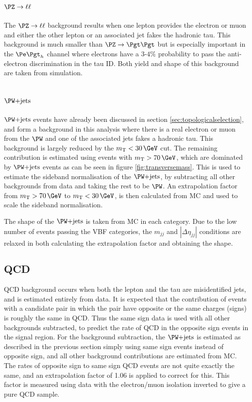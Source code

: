 \subsection{$\PZ\to\ell\ell$}
\label{sec:backgroundEstimation_Zll}

The $\PZ\to\ell\ell$ background results when one lepton provides the electron or
muon and either the other lepton or an associated jet fakes the hadronic tau. This
background is much smaller than $\ZToTauTau$ but is especially important in the
$\etau$ channel where electrons have a $3$-$4\%$ probability to pass the
anti-electron discrimination in the tau ID. Both yield and shape of this
background are taken from simulation.

\subsection{$\WJets$}
\label{sec:backgroundEstimation_WplusJets}

$\WJets$ events have already been discussed in section \ref{sec:topologicalselection},
and form a background in this analysis where there is a real electron or
muon from the $\PW$ and one of the associated jets fakes a hadronic tau. This
background is largely reduced by the $m_{\text{T}}< 30\,\GeV$ cut. 
The remaining contribution is estimated using 
events with $m_{\text{T}}> 70\,\GeV$, which are dominated by $\WJets$ 
events as can be seen in figure \ref{fig:transversemass}. 
This is used to estimate the sideband normalisation of the $\WJets$, by
subtracting all other backgrounds from data and taking the rest to be $\PW$.
An extrapolation factor from  $m_{\text{T}} > 70\,\GeV$ to $m_{\text{T}}< 30\,\GeV$, 
is then calculated from \ac{MC} and used to scale the sideband normalisation.

The shape of the $\WJets$ is taken from \ac{MC} in each category. Due to the low number of
events passing the VBF categories, the $m_{jj}$ and $|\Delta\eta_{jj}|$
conditions are relaxed in both calculating the extrapolation factor and
obtaining the shape.

\subsection{QCD}
\label{sec:backgroundEstimation_QCD}

QCD background occurs when both the lepton and the tau are misidentified jets, and is estimated 
entirely from data. It is expected that the contribution of events with a
candidate pair in which the pair have opposite or the same
charges (signs) is roughly the same in QCD. Thus the same
sign data is used with all other backgrounds subtracted, to predict the rate of
QCD in the opposite sign events in the signal region. 
For the background subtraction, the $\WJets$ is 
estimated as described in the previous section simply using same sign
events instead of opposite sign, and all other background
contributions are estimated from \ac{MC}. The rates of opposite sign to same
sign QCD events are not quite exactly the same, and an extrapolation factor of
1.06 is applied to correct for this. This factor is measured using data with the 
electron/muon isolation inverted to give a pure QCD sample. 

